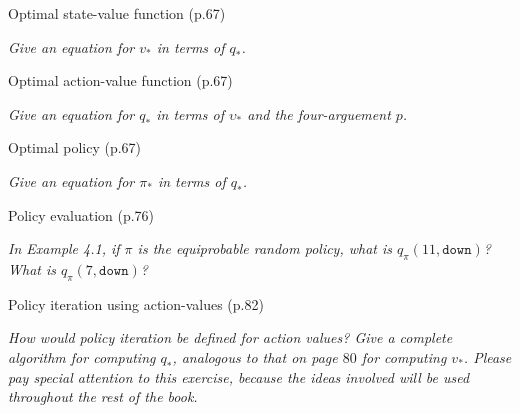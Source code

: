 \documentclass[12pt,letterpaper]{exam}
\newcommand{\chapter}{2}
\begin{document}
\begin{questions}
	\setcounter{question}{25-1}%
	\question%
	Optimal state-value function (p.67)

	\emph{Give an equation for \(v_*\) in terms of \(q_*\).}
	\begin{solution}
	\end{solution}

	\question%
	Optimal action-value function (p.67)

	\emph{Give an equation for \(q_*\) in terms of \(\upsilon_*\) and the four-arguement \(p\).}
	\begin{solution}
	\end{solution}

	\question%
	Optimal policy (p.67)

	\emph{Give an equation for \(\pi_*\) in terms of \(q_*\).}
	\begin{solution}
	\end{solution}

	\setcounter{section}{4}
	\renewcommand\chapter{4}
	\setcounter{question}{1-1}%
	\question%
	Policy evaluation (p.76)

	\emph{In Example 4.1, if \(\pi\) is the equiprobable random policy, what is \(q_\pi(11, \texttt{down})\)? 
	What is \(q_\pi(7, \texttt{down})\)?}
	\begin{solution}
	\end{solution}

	\setcounter{question}{5-1}%
	\question%
	Policy iteration using action-values (p.82)
	
	\emph{How would policy iteration be defined for action values? Give a complete algorithm for computing 
	\(q_*\), analogous to that on page \(80\) for computing \(v_*\). 
	Please pay special attention to this exercise, because the ideas involved will be used throughout the rest of the book.}
	\begin{solution}
	\end{solution}


\end{questions}
\end{document}

